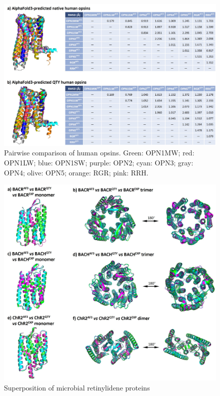 \documentclass[fleqn,10pt]{manuscript}
\begin{document}
\begin{figure}[htbp]
	\centering
	\includegraphics[width=\linewidth]{Figures/pairwise.jpg}
	\caption{Pairwise comparison of human opsins. Green: OPN1MW; red: OPN1LW; blue: OPN1SW; purple: OPN2; cyan: OPN3; gray: OPN4; olive: OPN5; orange: RGR; pink: RRH. }
	\label{fig:pairwise}
\end{figure}

\begin{figure}[htbp]
	\centering
	\includegraphics[width=\linewidth]{Figures/superposition-microbial.jpg}
	\caption{Superposition of microbial retinylidene proteins}
	\label{fig:microbialsup}
\end{figure}
\end{document}
